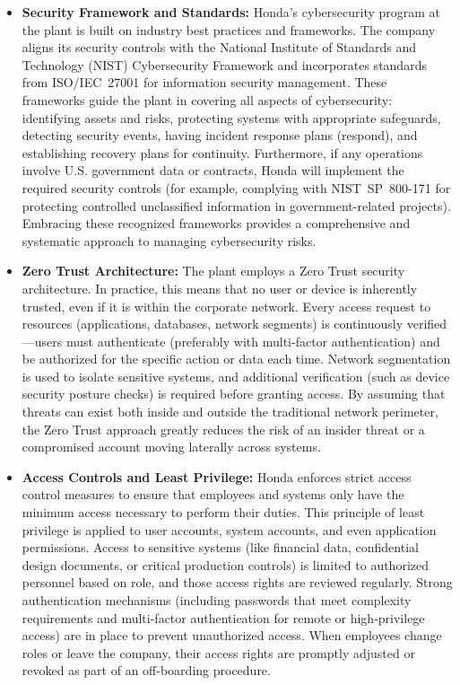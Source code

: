 \begin{itemize}
    \item \textbf{Security Framework and Standards:} Honda’s cybersecurity program at the plant is built on industry best practices and frameworks. The company aligns its security controls with the National Institute of Standards and Technology (NIST) Cybersecurity Framework and incorporates standards from ISO/IEC~27001 for information security management. These frameworks guide the plant in covering all aspects of cybersecurity: identifying assets and risks, protecting systems with appropriate safeguards, detecting security events, having incident response plans (respond), and establishing recovery plans for continuity. Furthermore, if any operations involve U.S. government data or contracts, Honda will implement the required security controls (for example, complying with NIST~SP~800-171 for protecting controlled unclassified information in government-related projects). Embracing these recognized frameworks provides a comprehensive and systematic approach to managing cybersecurity risks.
    \item \textbf{Zero Trust Architecture:} The plant employs a Zero Trust security architecture. In practice, this means that no user or device is inherently trusted, even if it is within the corporate network. Every access request to resources (applications, databases, network segments) is continuously verified---users must authenticate (preferably with multi-factor authentication) and be authorized for the specific action or data each time. Network segmentation is used to isolate sensitive systems, and additional verification (such as device security posture checks) is required before granting access. By assuming that threats can exist both inside and outside the traditional network perimeter, the Zero Trust approach greatly reduces the risk of an insider threat or a compromised account moving laterally across systems.
    \item \textbf{Access Controls and Least Privilege:} Honda enforces strict access control measures to ensure that employees and systems only have the minimum access necessary to perform their duties. This principle of least privilege is applied to user accounts, system accounts, and even application permissions. Access to sensitive systems (like financial data, confidential design documents, or critical production controls) is limited to authorized personnel based on role, and those access rights are reviewed regularly. Strong authentication mechanisms (including passwords that meet complexity requirements and multi-factor authentication for remote or high-privilege access) are in place to prevent unauthorized access. When employees change roles or leave the company, their access rights are promptly adjusted or revoked as part of an off-boarding procedure.

\end{itemize}
